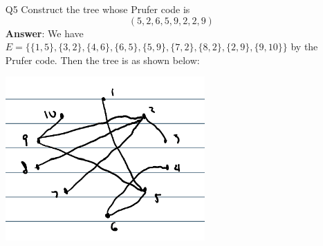 \documentclass{article}
\begin{document}
\newpage
\begin{itemize}
      \item [Q5]
            Construct the tree whose Prufer code is \[(5,2,6,5,9,2,2,9)\]
            \textbf{Answer}: We have $E=\{\{1,5\},\{3,2\},\{4,6\},\{6,5\},\{5,9\},\{7,2\},\{8,2\},\{2,9\},\{9,10\}\}$ by the Prufer code. Then the tree is as shown below:
            \begin{center}
                  \includegraphics[width=3in]{5.png}
            \end{center}
\end{itemize}
\end{document}
